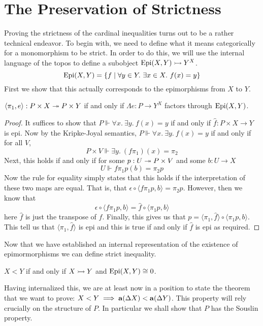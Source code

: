 \section{The Preservation of Strictness}\label{sec:strictness}

Proving the strictness of the cardinal inequalities turns out to be a
rather technical endeavor. To begin with, we need to define what it
means categorically for a monomorphism to be strict. In order to do
this, we will use the internal language of the topos to define a
subobject $\operatorname{Epi}(X, Y) \rightarrowtail Y^X$.
\[
  \epis(X, Y) = \{f \mid \forall y \in Y.\ \exists x \in X.\ f(x) = y\}
\]
First we show that this actually corresponds to the epimorphisms from
$X$ to $Y$.

\begin{lem}\label{lem:strictness:epis}
  $\langle \pi_1, e \rangle : P \times X \twoheadrightarrow P \times Y$ if and only if
  $\Lambda e : P \to Y^X$ factors through $\operatorname{Epi}(X, Y)$.
\end{lem}
\begin{proof}
  It suffices to show that $P \Vdash \forall x.\ \exists y.\ f(x) = y$
  if and only if $\hat{f} : P \times X \to Y$ is epi. Now by the
  Kripke-Joyal semantics, $P \Vdash \forall x.\ \exists y.\ f(x) = y$
  if and only if for all $V$,
  \[
    P \times V \Vdash \exists y.\ (f\pi_1)(x) = \pi_2
  \]
  Next, this holds if and only if for some $p : U \twoheadrightarrow P \times V$
  and some $b : U \to X$
  \[
    U \Vdash f\pi_1p(b) = \pi_2p
  \]
  Now the rule for equality simply states that this holds if the
  interpretation of these two maps are equal. That is, that
  $\epsilon \circ \langle f\pi_1p, b \rangle = \pi_2p$. However, then
  we know that
  \[
    \epsilon \circ \langle f\pi_1p, b \rangle =
    \hat{f} \circ \langle \pi_1 p, b \rangle
  \]
  here $\hat{f}$ is just the transpose of $f$. Finally, this gives us that
  $p = \langle \pi_1, \hat{f} \rangle \circ \langle \pi_1 p, b \rangle$.
  This tell us that $\langle \pi_1, \hat{f} \rangle$ is epi and this is
  true if and only if $\hat{f}$ is epi as required.
\end{proof}

Now that we have established an internal representation of the
existence of epimormorphisms we can define strict inequality.

\begin{defn}
  $X < Y$ if and only if $X \rightarrowtail Y$ and $\operatorname{Epi}(X, Y) \cong 0$.
\end{defn}

Having internalized this, we are at least now in a position to state
the theorem that we want to prove:
$X < Y \implies \mathbf{a}(\Delta X) < \mathbf{a}(\Delta Y)$. This
property will rely crucially on the structure of $P$. In particular we
shall show that $P$ has the Souslin property.

